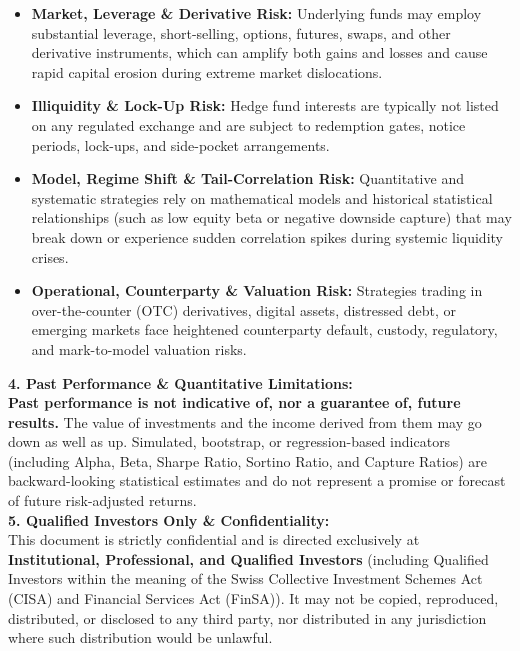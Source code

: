 \documentclass[10pt,a4paper]{article}
\begin{document}
\begin{tcolorbox}
{\begin{itemize}[leftmargin=1.3em, itemsep=1pt, topsep=1pt]
    \item \textbf{Market, Leverage \& Derivative Risk:} Underlying funds may employ substantial leverage, short-selling, options, futures, swaps, and other derivative instruments, which can amplify both gains and losses and cause rapid capital erosion during extreme market dislocations.
    \item \textbf{Illiquidity \& Lock-Up Risk:} Hedge fund interests are typically not listed on any regulated exchange and are subject to redemption gates, notice periods, lock-ups, and side-pocket arrangements.
    \item \textbf{Model, Regime Shift \& Tail-Correlation Risk:} Quantitative and systematic strategies rely on mathematical models and historical statistical relationships (such as low equity beta or negative downside capture) that may break down or experience sudden correlation spikes during systemic liquidity crises.
    \item \textbf{Operational, Counterparty \& Valuation Risk:} Strategies trading in over-the-counter (OTC) derivatives, digital assets, distressed debt, or emerging markets face heightened counterparty default, custody, regulatory, and mark-to-model valuation risks.
\end{itemize}
\vspace{2.5pt}
\textbf{4. Past Performance \& Quantitative Limitations:}\\[1.5pt]
\textbf{Past performance is not indicative of, nor a guarantee of, future results.} The value of investments and the income derived from them may go down as well as up. Simulated, bootstrap, or regression-based indicators (including Alpha, Beta, Sharpe Ratio, Sortino Ratio, and Capture Ratios) are backward-looking statistical estimates and do not represent a promise or forecast of future risk-adjusted returns.\\[4.5pt]
\textbf{5. Qualified Investors Only \& Confidentiality:}\\[1.5pt]
This document is strictly confidential and is directed exclusively at \textbf{Institutional, Professional, and Qualified Investors} (including Qualified Investors within the meaning of the Swiss Collective Investment Schemes Act (CISA) and Financial Services Act (FinSA)). It may not be copied, reproduced, distributed, or disclosed to any third party, nor distributed in any jurisdiction where such distribution would be unlawful.
}
\end{tcolorbox}
\end{document}
